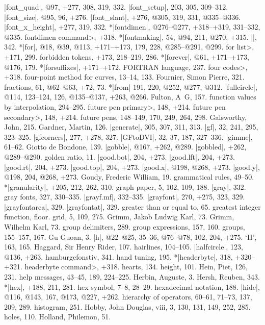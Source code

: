 |font_quad|, @97, +277, 308, 319, 332.
|font_setup|, 203, 305, 309--312.
|font_size|, @95, 96, +276.
|font_slant|, +276, @305, 319, 331, @335--@336.
|font_x_height|, +277, 319, 332.
*|fontdimen|, @276--@277, +318--+319, 331--332, @335.
\<fontdimen command>, +318.
*|fontmaking|, 54, @94, 211, @270, +315.
|\fontname|, 342.
*|for|, @18, @39, @113, +171--+173, 179, 228, @285--@291, @299.
\<for list>, +171, 299.
forbidden tokens, +173, 218--219, 286.
*|forever|, @61, +171--+173, @176, 179.
*|forsuffixes|, +171--+172.
{\sevenrm FORTRAN} language, 237.
\<four codes>, +318.
four-point method for curves, 13--14, 133.
Fournier, Simon Pierre, 321. %
fractions, 61, @62--@63, +72, 73.
*|from| 191, 220, @252, @277, @312.
|fullcircle|, @114, 123--124, 126, @135--@137, +263, @266.
Fulton, A\period\ G\period, 157.
function values by interpolation, 294--295.
\<future pen primary>, 148, +214.
\<future pen secondary>, 148, +214.
future pens, 148--149, 170, 249, 264, 298.
\newletter
Galsworthy, John, 215.
Gardner, Martin, 126.
|generate|, 305, 307, 311, 313.
|gf|, 32, 241, 295, 323--325.
|gfcorners|, 277, +278, 327.
|GFtoDVI|, 32, 37, 187, 327--336.
|gimme|, 61--62.
Giotto de Bondone, 139.
|gobble|, @167, +262, @289.
|gobbled|, +262, @289--@290.
golden ratio, 11.
|good.bot|, 204, +273.
|good.lft|, 204, +273.
|good.rt|, 204, +273.
|good.top|, 204, +273.
|good.x|, @198, @268, +273.
|good.y|, @198, 204, @268, +273.
Goudy, Frederic William, 19.
grammatical rules, 49--50.
*|granularity|, +205, 212, 262, 310.
graph paper, 5, 102, 109, 188.
|gray|, 332.
gray fonts, 327, 330--335.
|grayf.mf|, 332--335.
|grayfont|, 270, +275, 323, 329.
|grayfontarea|, 329.
|grayfontat|, 329.
greater than or equal to, 65.
greatest integer function, \see floor.
grid, 5, 109, 275.
Grimm, Jakob Ludwig Karl, 73.
Grimm, Wilhelm Karl, 73.
group delimiters, 289.
group expressions, 157, 160.
groups, 155--157, 167.
Gu Guoan, 3.
\newletter
|h|, @22--@25, 35--36, @76--@78, 102, 204, +275.
`H', 163, 165.
Haggard, Sir Henry Rider, 107.
hairlines, 104--105.
|halfcircle|, 123, @136, +263.
hamburgefonstiv, 341.
hand tuning, 195.
*|headerbyte|, 318, +320--+321.
\<headerbyte command>, +318.
hearts, 134.
height, 101.
Hein, Piet, 126, 231.
help messages, 43--45, 189, 224--225.
Herbin, Auguste, 3.
Hersh, Reuben, 343.
*|hex|, +188, 211, 281.
hex symbol, 7--8, 28--29.
hexadecimal notation, 188.
|hide|, @116, @143, 167, @173, @227, +262.
hierarchy of operators, 60--61, 71--73, 137, 209, 289.
histogram, 251.
Hobby, John Douglas, viii, 3, 130, 131, 149, 252, 285.
holes, 110.
Holland, Philemon, 51.
